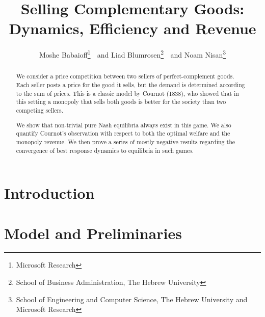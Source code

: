 \documentclass[11pt,a4paper]{article}
\begin{document}
\title{Selling Complementary Goods:\\ Dynamics, Efficiency and Revenue}
\author{Moshe Babaioff\footnote{Microsoft Research }  
$\;$ and
Liad Blumrosen\footnote{School of Business Administration, The Hebrew University } 
$\;$ and
Noam Nisan\footnote{School of Engineering and Computer Science, The Hebrew University and Microsoft Research}
}

\date{}
\maketitle

\begin{abstract}
We consider a price competition between two sellers of perfect-complement goods.
Each seller posts a price for the good it sells, but the demand is determined according to the sum of prices. This is a classic model by Cournot (1838), who showed that in this setting a monopoly that sells both goods is better for the society than two competing sellers.

We show that non-trivial pure Nash equilibria always exist in this game.
We also %
quantify Cournot's observation
with respect
to  both the optimal welfare and the monopoly revenue.
We then prove a series of mostly negative results regarding the convergence of best response dynamics to equilibria in such games.
\end{abstract}

\maketitle


\section{Introduction}



\section{Model and Preliminaries}
\label{sec:model}
\end{document}
